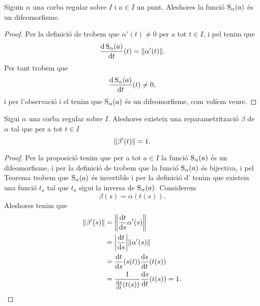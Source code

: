 \documentclass[../../Main.tex]{subfiles}
\begin{document}
	\begin{proposition}
		\label{prop:la funció longitud arc d'una corba regular és un difeomorfisme}
		Siguin \(\alpha\) una corba regular sobre \(I\) i \(a\in I\) un punt. Aleshores la funció \(\operatorname{S}_{\alpha}(a)\) és un difeomorfisme. %
		\begin{proof}
			Per la definició de  trobem que \(\alpha'(t)\neq0\) per a tot \(t\in I\), i pel  tenim que
			\[
			    \frac{\diff\funciolongituddarc_{\alpha}(a)}{\diff t}(t)=\norm{\alpha'(t)}.
			\]
			Per tant trobem que %
			\[
			    \frac{\mathop{}\!\mathrm{d}\operatorname{S}_{\alpha}(a)}{\mathop{}\!\mathrm{d} t}(t)\neq0,
			\]
			i per l'observació  i el \corollari{}  tenim que \(\operatorname{S}_{\alpha}(a)\) és un difeomorfisme, com volíem veure. %
		\end{proof}
	\end{proposition}
	\begin{proposition} %
		\label{prop:podem trobar una reparametrització amb velocitat unitaria de qualsevol corba regular}
		Sigui \(\alpha\) una corba regular sobre \(I\). Aleshores existeix una reparametrització \(\beta\) de \(\alpha\) tal que per a tot \(t\in I\)
		\[
		    \norm{\beta'(t)}=1.
		\]
		\begin{proof}
			Per la proposició  tenim que per a tot \(a\in I\) la funció \(\operatorname{S}_{\alpha}(a)\) és un difeomorfisme, i per la definició de  trobem que la funció \(\operatorname{S}_{\alpha}(a)\) és bijectiva, i pel Teorema  trobem que \(\operatorname{S}_{\alpha}(a)\) és invertible i per la definició d' tenim que existeix una funció \(t_{a}\) tal que \(t_{a}\) sigui la inversa de \(\operatorname{S}_{\alpha}(a)\). Considerem
			\[
			    \beta(s)=\alpha(t(s)).
			\]
			Aleshores tenim que
			\begin{align*} %
				\norm{\beta'(s)}&=\norm{\frac{\diff t}{\diff s}\alpha'(s)} \\
				&=\abs{\frac{\diff t}{\diff s}}\norm{\alpha'(s)} \\
				&=\frac{\diff t}{\diff s}(s(t))\frac{\diff s}{\diff t}(t(s))\\
				&=\frac{1}{\frac{\diff s}{\diff t}(t(s))}\frac{\diff s}{\diff t}(t(s))=1. \qedhere
			\end{align*}
		\end{proof}
	\end{proposition}
\end{document}
